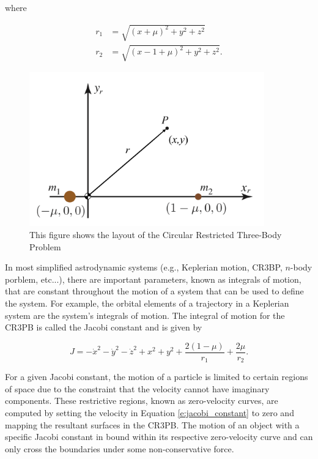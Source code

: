 \documentclass[11pt]{article} %
\begin{document}
\noindent
where

\begin{align}
	r_1 & = \sqrt{\left(x + \mu\right)^2 + y^2 + z^2} \\
	r_2 & = \sqrt{\left(x - 1 + \mu\right)^2 + y^2 + z^2}.
\end{align}

\begin{figure}[H]
	\centering
	\includegraphics[width=4in]{CR3BP.png}\nonumber
	\caption{This figure shows the layout of the Circular Restricted Three-Body Problem \cite{KoonLoMarsdenRoss2011}}
	\label{f:CR3BP}
\end{figure}

In most simplified astrodynamic systems (e.g., Keplerian motion, CR3BP, $n$-body porblem, etc...), there are important parameters, known as integrals of motion, that are constant throughout the motion of a system that can be used to define the system. For example, the orbital elements of a trajectory in a Keplerian system are the system's integrals of motion. The integral of motion for the CR3PB is called the Jacobi constant and is given by 

\begin{equation}
	J = -\dot{x}^2-\dot{y}^2-\dot{z}^2+x^2+y^2 + \frac{2\left(1-\mu\right)}{r_1} + \frac{2\mu}{r_2}.
	\label{e:jacobi_constant}
\end{equation}

\noindent
For a given Jacobi constant, the motion of a particle is limited to certain regions of space due to the constraint that the velocity cannot have imaginary components. These restrictive regions, known as zero-velocity curves, are computed by setting the velocity in Equation \ref{e:jacobi_constant} to zero and mapping the resultant surfaces in the CR3PB. The motion of an object with a specific Jacobi constant in bound within its respective zero-velocity curve and can only cross the boundaries under some non-conservative force.
\end{document}
